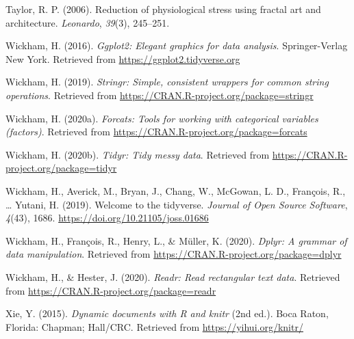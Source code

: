 \documentclass[english,jou]{apa6}
\begin{document}
\leavevmode\hypertarget{ref-taylor2006reduction}{}%
Taylor, R. P. (2006). Reduction of physiological stress using fractal art and architecture. \emph{Leonardo}, \emph{39}(3), 245--251.

\leavevmode\hypertarget{ref-R-ggplot2}{}%
Wickham, H. (2016). \emph{Ggplot2: Elegant graphics for data analysis}. Springer-Verlag New York. Retrieved from \url{https://ggplot2.tidyverse.org}

\leavevmode\hypertarget{ref-R-stringr}{}%
Wickham, H. (2019). \emph{Stringr: Simple, consistent wrappers for common string operations}. Retrieved from \url{https://CRAN.R-project.org/package=stringr}

\leavevmode\hypertarget{ref-R-forcats}{}%
Wickham, H. (2020a). \emph{Forcats: Tools for working with categorical variables (factors)}. Retrieved from \url{https://CRAN.R-project.org/package=forcats}

\leavevmode\hypertarget{ref-R-tidyr}{}%
Wickham, H. (2020b). \emph{Tidyr: Tidy messy data}. Retrieved from \url{https://CRAN.R-project.org/package=tidyr}

\leavevmode\hypertarget{ref-R-tidyverse}{}%
Wickham, H., Averick, M., Bryan, J., Chang, W., McGowan, L. D., François, R., \ldots{} Yutani, H. (2019). Welcome to the tidyverse. \emph{Journal of Open Source Software}, \emph{4}(43), 1686. \url{https://doi.org/10.21105/joss.01686}

\leavevmode\hypertarget{ref-R-dplyr}{}%
Wickham, H., François, R., Henry, L., \& Müller, K. (2020). \emph{Dplyr: A grammar of data manipulation}. Retrieved from \url{https://CRAN.R-project.org/package=dplyr}

\leavevmode\hypertarget{ref-R-readr}{}%
Wickham, H., \& Hester, J. (2020). \emph{Readr: Read rectangular text data}. Retrieved from \url{https://CRAN.R-project.org/package=readr}

\leavevmode\hypertarget{ref-R-knitr}{}%
Xie, Y. (2015). \emph{Dynamic documents with R and knitr} (2nd ed.). Boca Raton, Florida: Chapman; Hall/CRC. Retrieved from \url{https://yihui.org/knitr/}

\endgroup
\end{document}
